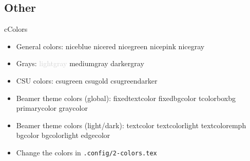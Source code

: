 \subsection*{Other}
\begin{myslide}{c}{Colors}

\begin{itemize}

\item General colors:
\textcolor{niceblue}{niceblue}
\textcolor{nicered}{nicered}
\textcolor{nicegreen}{nicegreen}
\textcolor{nicepink}{nicepink}
\textcolor{nicegray}{nicegray}

\item Grays:
\textcolor{lightgray}{lightgray}
\textcolor{mediumgray}{mediumgray}
\textcolor{darkergray}{darkergray}

\item CSU colors:
\textcolor{csugreen}{csugreen}
\textcolor{csugold}{csugold}
\textcolor{csugreendarker}{csugreendarker}


\item Beamer theme colors (global):
\textcolor{fixedtextcolor}{fixedtextcolor}
\textcolor{fixedbgcolor}{fixedbgcolor}
\textcolor{tcolorboxbg}{tcolorboxbg}
\textcolor{primarycolor}{primarycolor}
\textcolor{graycolor}{graycolor}

\item Beamer theme colors (light/dark):
\textcolor{textcolor}{textcolor}
\textcolor{textcolorlight}{textcolorlight}
\textcolor{textcoloremph}{textcoloremph}
\textcolor{bgcolor}{bgcolor}
\textcolor{bgcolorlight}{bgcolorlight}
\textcolor{edgecolor}{edgecolor}

\item Change the colors in \lstinline{.config/2-colors.tex}

\end{itemize}

\end{myslide}

